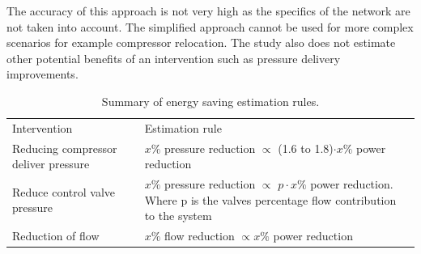 \par 
The accuracy of this approach is not very high as the specifics of the network are not taken into account. The simplified approach cannot be used for more complex scenarios for example compressor relocation. The study also does not estimate other potential benefits of an intervention such as pressure delivery improvements.
\par 
\begin{table}[h]
	\centering
	\begin{tabular}{p{}p{}p{}}
		\hline
		Intervention && Estimation rule\\
		\hhline{===} 
		Reducing compressor deliver pressure & & $x \%$ pressure reduction  $\propto$ (1.6 to 1.8)$\cdot x\%$ power reduction \newline \\
		Reduce control valve pressure &  &$x \%$ pressure reduction $\propto$  $p\cdot x\%$ power reduction. \newline \newline Where p is the valves percentage flow contribution to the system \newline \\
		Reduction of flow && $x \%$ flow reduction  $\propto x \%$ power reduction \newline\\
		\hline
	\end{tabular} 
	\caption[Summary of energy saving estimation rules]{Summary of energy saving estimation rules\cite{Marais2012PhD}.}
	\label{table: Rules of thumb}
\end{table}

